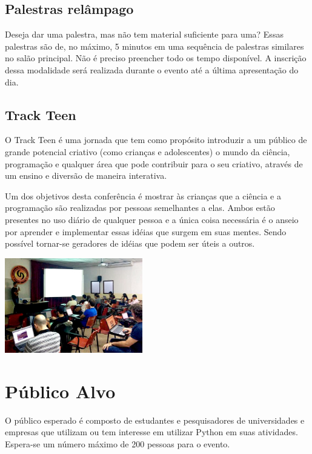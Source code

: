 \documentclass[a4paper,twocolumn,openright,article]{memoir}
\begin{document}
\section*{Palestras relâmpago}

Deseja dar uma palestra, mas não tem material suficiente para uma? Essas palestras são de, no máximo, 5 minutos em uma sequência de palestras similares no salão principal. Não é preciso preencher todo os tempo disponível. A inscrição dessa modalidade será realizada durante o evento até a última apresentação do dia.

\section*{Track Teen}

O Track Teen é uma jornada que tem como propósito introduzir a um público de grande potencial criativo (como crianças e adolescentes) o mundo da ciência, programação e qualquer área que pode contribuir para o seu criativo, através de um ensino e diversão de maneira interativa. 

Um dos objetivos desta conferência é mostrar às crianças que a ciência e a programação são realizadas por pessoas semelhantes a elas. Ambos estão presentes no uso diário de qualquer pessoa e a única coisa necessária é o anseio por aprender e implementar essas idéias que surgem em suas mentes. Sendo possível tornar-se geradores de idéias que podem ser úteis a outros.

\ifprint
\else	
	\begin{center}
		\includegraphics[width=6cm]{imagens/CFc8POiWYAEcPAV-small.jpg}
	\end{center}
\fi

\chapter*{Público Alvo}

O público esperado é composto de estudantes e pesquisadores de universidades e empresas que utilizam ou tem interesse em utilizar Python em suas atividades. Espera-se um número máximo de 200 pessoas para o evento.
\end{document}
